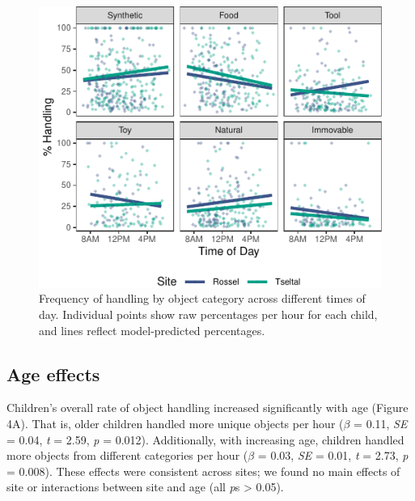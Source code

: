 \documentclass[10pt, letterpaper]{article}
\newenvironment{CodeChunk}{}{}
\begin{document}
\begin{CodeChunk}
\begin{figure}[!ht]

{\centering \includegraphics{figs/tod-effects-fig-1} 

}

\caption[Frequency of handling by object category across different times of day]{Frequency of handling by object category across different times of day. Individual points show raw percentages per hour for each child, and lines reflect model-predicted percentages.}\label{fig:tod-effects-fig}
\end{figure}
\end{CodeChunk}

\hypertarget{age-effects}{%
\subsection{Age effects}\label{age-effects}}

Children's overall rate of object handling increased significantly with
age (Figure 4A). That is, older children handled more unique objects per
hour (\(\beta\) = 0.11, \emph{SE} = 0.04, \emph{t} = 2.59, \emph{p} =
0.012). Additionally, with increasing age, children handled more objects
from different categories per hour (\(\beta\) = 0.03, \emph{SE} = 0.01,
\emph{t} = 2.73, \emph{p} = 0.008). These effects were consistent across
sites; we found no main effects of site or interactions between site and
age (all \emph{p}s \textgreater{} 0.05).
\end{document}
